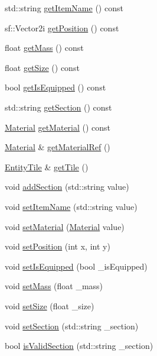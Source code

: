\begin{DoxyCompactItemize}
\item 
std\+::string \mbox{\hyperlink{class_item_a806159273f1f9fbb07fe75a74f2f51c5}{get\+Item\+Name}} () const
\item 
sf\+::\+Vector2i \mbox{\hyperlink{class_item_ab015078a1ea19c197fc88b7a556d37cc}{get\+Position}} () const
\item 
float \mbox{\hyperlink{class_item_a452c0983b99f1b148949274b63ed79fd}{get\+Mass}} () const
\item 
float \mbox{\hyperlink{class_item_a2a84b0b0b25d4d1e8bb1b456d8094b84}{get\+Size}} () const
\item 
bool \mbox{\hyperlink{class_item_a9839c6a1b61487bbbe15b7ebba07de34}{get\+Is\+Equipped}} () const
\item 
std\+::string \mbox{\hyperlink{class_item_abe4ed40d2027ca131b669d471b47f29f}{get\+Section}} () const
\item 
\mbox{\hyperlink{class_material}{Material}} \mbox{\hyperlink{class_item_ada6692d4e0e9e8f9a9a78a13fd6522d8}{get\+Material}} () const
\item 
\mbox{\hyperlink{class_material}{Material}} \& \mbox{\hyperlink{class_item_af22ec5d207b70e2a3359e76dccfc7e11}{get\+Material\+Ref}} ()
\item 
\mbox{\hyperlink{class_entity_tile}{Entity\+Tile}} \& \mbox{\hyperlink{class_item_a61272a187be1a07a49685cbee45d30bd}{get\+Tile}} ()
\item 
void \mbox{\hyperlink{class_item_a6c9f73ef36b176cdb75bc9b13d5be8e8}{add\+Section}} (std\+::string value)
\item 
void \mbox{\hyperlink{class_item_ae8dd38d585a7795f134f6453feb1000e}{set\+Item\+Name}} (std\+::string value)
\item 
void \mbox{\hyperlink{class_item_af8f9e1899f933fc2ae2cdee6c7de0a4e}{set\+Material}} (\mbox{\hyperlink{class_material}{Material}} value)
\item 
void \mbox{\hyperlink{class_item_af8f03acf491fb71ec8cf1e4248bb4b3d}{set\+Position}} (int x, int y)
\item 
void \mbox{\hyperlink{class_item_ade0d63a4f02aa1a97f977b13f96eb891}{set\+Is\+Equipped}} (bool \+\_\+is\+Equipped)
\item 
void \mbox{\hyperlink{class_item_a3d6c15b2f0a37709541086df917aa761}{set\+Mass}} (float \+\_\+mass)
\item 
void \mbox{\hyperlink{class_item_a5ec923033eeb77f331c8307ef5141fc4}{set\+Size}} (float \+\_\+size)
\item 
void \mbox{\hyperlink{class_item_a87100c3d13e81e42e58969f817d591ef}{set\+Section}} (std\+::string \+\_\+section)
\item 
bool \mbox{\hyperlink{class_item_a10dd503844c230e3d3bf890e969af867}{is\+Valid\+Section}} (std\+::string \+\_\+section)
\end{DoxyCompactItemize}
